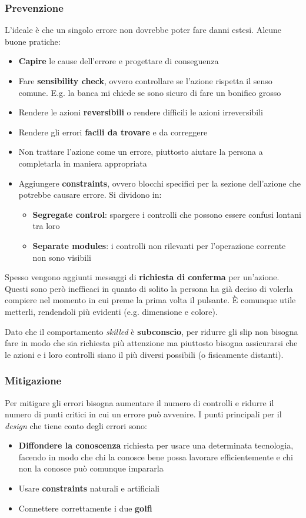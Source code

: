 \subsubsection{Prevenzione}
L'ideale è che un singolo errore non dovrebbe poter fare danni estesi. Alcune buone pratiche:
\begin{itemize}
	\item \textbf{Capire} le cause dell'errore e progettare di conseguenza
	\item Fare \textbf{sensibility check}, ovvero controllare se l'azione rispetta il senso comune. E.g. la banca mi chiede se sono sicuro di fare un bonifico grosso
	\item Rendere le azioni \textbf{reversibili} o rendere difficili le azioni irreversibili
	\item Rendere gli errori \textbf{facili da trovare} e da correggere
	\item Non trattare l'azione come un errore, piuttosto aiutare la persona a completarla in maniera appropriata
	\item Aggiungere \textbf{constraints}, ovvero blocchi specifici per la sezione dell'azione che potrebbe causare errore. Si dividono in:
	\begin{itemize}
		\item \textbf{Segregate control}: spargere i controlli che possono essere confusi lontani tra loro
		\item \textbf{Separate modules}: i controlli non rilevanti per l'operazione corrente non sono visibili
	\end{itemize}
\end{itemize}
Spesso vengono aggiunti messaggi di \textbf{richiesta di conferma} per un'azione. Questi sono però inefficaci in quanto di solito la persona ha già deciso di volerla compiere nel momento in cui preme la prima volta il pulsante. È comunque utile metterli, rendendoli più evidenti (e.g. dimensione e colore).
\newpage
\begin{note}
	Dato che il comportamento \textit{skilled} è \textbf{subconscio}, per ridurre gli slip non bisogna fare in modo che sia richiesta più attenzione ma piuttosto bisogna assicurarsi che le azioni e i loro controlli siano il più diversi possibili (o fisicamente distanti).
\end{note}
\subsubsection{Mitigazione}
Per mitigare gli errori bisogna aumentare il numero di controlli e ridurre il numero di punti critici in cui un errore può avvenire. I punti principali per il \textit{design} che tiene conto degli errori sono:
\begin{itemize}
	\item \textbf{Diffondere la conoscenza} richiesta per usare una determinata tecnologia, facendo in modo che chi la conosce bene possa lavorare efficientemente e chi non la conosce può comunque impararla
	\item Usare \textbf{constraints} naturali e artificiali
	\item Connettere correttamente i due \textbf{golfi}
\end{itemize}

